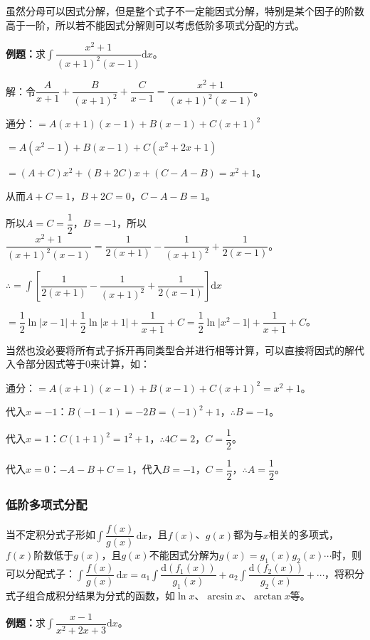 \documentclass[UTF8, 12pt]{ctexart}
\begin{document}
虽然分母可以因式分解，但是整个式子不一定能因式分解，特别是某个因子的阶数高于一阶，所以若不能因式分解则可以考虑低阶多项式分配的方式。

\textbf{例题：}求$\displaystyle{\int\dfrac{x^2+1}{(x+1)^2(x-1)}\textrm{d}x}$。\medskip

解：令$\dfrac{A}{x+1}+\dfrac{B}{(x+1)^2}+\dfrac{C}{x-1}=\dfrac{x^2+1}{(x+1)^2(x-1)}$。 \medskip

通分：$=A(x+1)(x-1)+B(x-1)+C(x+1)^2$

$=A(x^2-1)+B(x-1)+C(x^2+2x+1)$

$=(A+C)x^2+(B+2C)x+(C-A-B)=x^2+1$。

从而$A+C=1$，$B+2C=0$，$C-A-B=1$。

所以$A=C=\dfrac{1}{2}$，$B=-1$，所以$\dfrac{x^2+1}{(x+1)^2(x-1)}=\dfrac{1}{2(x+1)}-\dfrac{1}{(x+1)^2}+\dfrac{1}{2(x-1)}$。

$\therefore=\displaystyle{\int\left[\dfrac{1}{2(x+1)}-\dfrac{1}{(x+1)^2}+\dfrac{1}{2(x-1)}\right]\textrm{d}x}$ \medskip

$=\dfrac{1}{2}\ln\vert x-1\vert+\dfrac{1}{2}\ln\vert x+1\vert+\dfrac{1}{x+1}+C=\dfrac{1}{2}\ln\vert x^2-1\vert+\dfrac{1}{x+1}+C$。

当然也没必要将所有式子拆开再同类型合并进行相等计算，可以直接将因式的解代入令部分因式等于0来计算，如：

通分：$=A(x+1)(x-1)+B(x-1)+C(x+1)^2=x^2+1$。

代入$x=-1$：$B(-1-1)=-2B=(-1)^2+1$，$\therefore B=-1$。

代入$x=1$：$C(1+1)^2=1^2+1$，$\therefore4C=2$，$C=\dfrac{1}{2}$。

代入$x=0$：$-A-B+C=1$，代入$B=-1$，$C=\dfrac{1}{2}$，$\therefore A=\dfrac{1}{2}$。

\subsubsection{低阶多项式分配}

当不定积分式子形如$\displaystyle{\int\dfrac{f(x)}{g(x)}\,\textrm{d}x}$，且$f(x)$、$g(x)$都为与$x$相关的多项式，$f(x)$阶数低于$g(x)$，且$g(x)$不能因式分解为$g(x)=g_1(x)g_2(x)\cdots$时，则可以分配式子：$\displaystyle{\int\dfrac{f(x)}{g(x)}\,\textrm{d}x=a_1\int\dfrac{\textrm{d}(f_1(x))}{g_1(x)}+a_2\int\dfrac{\textrm{d}(f_2(x))}{g_2(x)}}+\cdots$，将积分式子组合成积分结果为分式的函数，如$\ln x$、$\arcsin x$、$\arctan x$等。

\textbf{例题：}求$\displaystyle{\int\dfrac{x-1}{x^2+2x+3}\textrm{d}x}$。
\end{document}
